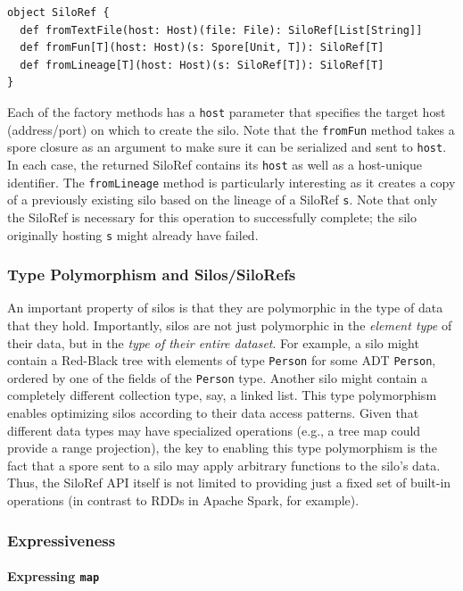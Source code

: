 \documentclass{jfp1}
\begin{document}
\begin{lstlisting}
object SiloRef {
  def fromTextFile(host: Host)(file: File): SiloRef[List[String]]
  def fromFun[T](host: Host)(s: Spore[Unit, T]): SiloRef[T]
  def fromLineage[T](host: Host)(s: SiloRef[T]): SiloRef[T]
}
\end{lstlisting}
\noindent
Each of the factory methods has a \verb|host| parameter that specifies the
target host (address/port) on which to create the silo. Note that the
\verb|fromFun| method takes a spore closure as an argument to make sure it can
be serialized and sent to \verb|host|. In each case, the returned SiloRef
contains its \verb|host| as well as a host-unique identifier. The
\verb|fromLineage| method is particularly interesting as it creates a copy of a
previously existing silo based on the lineage of a SiloRef \verb|s|. Note that
only the SiloRef is necessary for this operation to successfully complete; the
silo originally hosting \verb|s| might already have failed.

\subsubsection{Type Polymorphism and Silos/SiloRefs}

An important property of silos is that they are polymorphic in the type of data
that they hold. Importantly, silos are not just polymorphic in the {\em element
type} of their data, but in the {\em type of their entire dataset}. For example,
a silo might contain a Red-Black tree with elements of type \verb|Person| for
some ADT \verb|Person|, ordered by one of the fields of the \verb|Person| type.
Another silo might contain a completely different collection type, say, a linked
list. This type polymorphism enables optimizing silos according to their data
access patterns. Given that different data types may have specialized operations
(e.g., a tree map could provide a range projection), the key to enabling this
type polymorphism is the fact that a spore sent to a silo may apply arbitrary
functions to the silo's data. Thus, the SiloRef API itself is not limited to
providing just a fixed set of built-in operations (in contrast to RDDs in Apache
Spark, for example).

\subsubsection{Expressiveness}
\label{sec:expr}

\paragraph{Expressing \texttt{map}}
\end{document}
